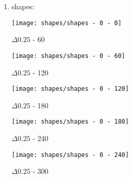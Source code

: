 \begin{enumerate}
\begin{multicols}{4}
\begin{center}
    \texttt{[image: peanut/peanut - 2880]}

    $\Delta 0.25$ - 3040

    \texttt{[image: peanut/peanut - 3040]}

    $\Delta 0.25$ - 3200

    \texttt{[image: peanut/peanut - 3200]}

    $\Delta 0.25$ - 3360

    \texttt{[image: peanut/peanut - 3360]}

    $\Delta 0.25$ - 3520

    \texttt{[image: peanut/peanut - 3520]}

    $\Delta 0.25$ - 3680

    \texttt{[image: peanut/peanut - 3680]}

    $\Delta 0.25$ - 3840

    \texttt{[image: peanut/peanut - 3840]}

    $\Delta 0.25$ - 4000

    \texttt{[image: peanut/peanut - 4000]}

    \newpage
  \end{center}
  \end{multicols}

  \newpage
  \item shapes:
  \begin{center}
    \texttt{[image: shapes/shapes - 0 - 0]}
  \end{center}

    \begin{multicols}{3}
    \begin{center}
    $\Delta 0.25$ - 60

    \texttt{[image: shapes/shapes - 0 - 60]}

    $\Delta 0.25$ - 120

    \texttt{[image: shapes/shapes - 0 - 120]}

    $\Delta 0.25$ - 180

    \texttt{[image: shapes/shapes - 0 - 180]}

    $\Delta 0.25$ - 240

    \texttt{[image: shapes/shapes - 0 - 240]}

    $\Delta 0.25$ - 300


\end{center}
\end{multicols}
\end{enumerate}
